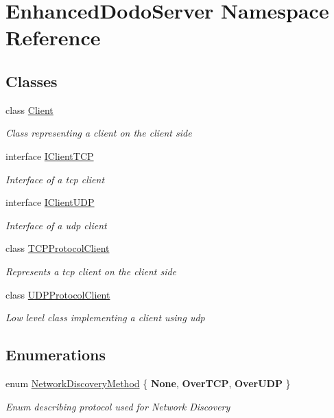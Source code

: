 \hypertarget{namespace_enhanced_dodo_server}{}\section{Enhanced\+Dodo\+Server Namespace Reference}
\label{namespace_enhanced_dodo_server}
\subsection*{Classes}
\begin{DoxyCompactItemize}
\item 
class \mbox{\hyperlink{class_enhanced_dodo_server_1_1_client}{Client}}
\begin{DoxyCompactList}\small\item\em Class representing a client on the client side \end{DoxyCompactList}\item 
interface \mbox{\hyperlink{interface_enhanced_dodo_server_1_1_i_client_t_c_p}{I\+Client\+T\+CP}}
\begin{DoxyCompactList}\small\item\em Interface of a tcp client \end{DoxyCompactList}\item 
interface \mbox{\hyperlink{interface_enhanced_dodo_server_1_1_i_client_u_d_p}{I\+Client\+U\+DP}}
\begin{DoxyCompactList}\small\item\em Interface of a udp client \end{DoxyCompactList}\item 
class \mbox{\hyperlink{class_enhanced_dodo_server_1_1_t_c_p_protocol_client}{T\+C\+P\+Protocol\+Client}}
\begin{DoxyCompactList}\small\item\em Represents a tcp client on the client side \end{DoxyCompactList}\item 
class \mbox{\hyperlink{class_enhanced_dodo_server_1_1_u_d_p_protocol_client}{U\+D\+P\+Protocol\+Client}}
\begin{DoxyCompactList}\small\item\em Low level class implementing a client using udp \end{DoxyCompactList}\end{DoxyCompactItemize}
\subsection*{Enumerations}
\begin{DoxyCompactItemize}
\item 
enum \mbox{\hyperlink{namespace_enhanced_dodo_server_ab7ed9134420741255e959334cdc5207a}{Network\+Discovery\+Method}} \{ {\bfseries None}, 
{\bfseries Over\+T\+CP}, 
{\bfseries Over\+U\+DP}
 \}
\begin{DoxyCompactList}\small\item\em Enum describing protocol used for Network Discovery \end{DoxyCompactList}\end{DoxyCompactItemize}


